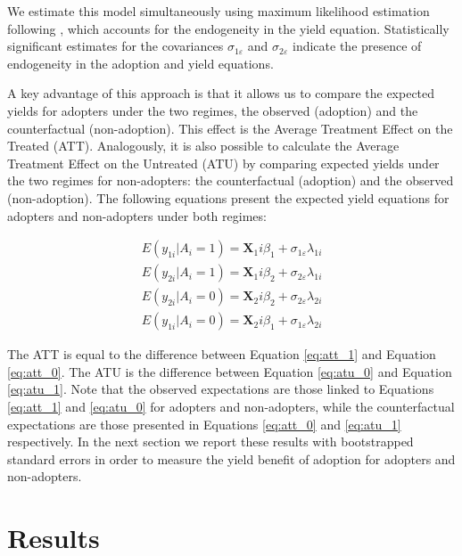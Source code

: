 \documentclass[11pt]{article}
\begin{document}
We estimate this model simultaneously using maximum likelihood estimation following \cite{lokshin2004maximum}, which accounts for the endogeneity in the yield equation.  Statistically significant estimates for the covariances $\sigma_{1\varepsilon}$ and $\sigma_{2\varepsilon}$ indicate the presence of endogeneity in the adoption and yield equations. 


A key advantage of this approach is that it allows us to compare the expected yields for adopters under the two regimes, the observed (adoption) and the counterfactual (non-adoption). This effect is the Average Treatment Effect on the Treated (ATT). Analogously, it is also possible to calculate the Average Treatment Effect on the Untreated (ATU) by comparing expected yields under the two regimes for non-adopters: the counterfactual (adoption) and the observed (non-adoption). The following equations present the expected yield equations for adopters and non-adopters under both regimes:

\begin{subequations}
\begin{align}
    E(y_{1i}|A_i=1)=\bm{X}_1i\beta_1+\sigma_{1\varepsilon} \lambda_{1i} \label{eq:att_1} \\
    E(y_{2i}|A_i=1)=\bm{X}_1i\beta_2+\sigma_{2\varepsilon} \lambda_{1i} \label{eq:att_0} \\
    E(y_{2i}|A_i=0)=\bm{X}_2i\beta_2+\sigma_{2\varepsilon} \lambda_{2i} \label{eq:atu_0} \\
    E(y_{1i}|A_i=0)=\bm{X}_2i\beta_1+\sigma_{1\varepsilon} \lambda_{2i} \label{eq:atu_1}    
\end{align}
\end{subequations}

The ATT is equal to the difference between Equation \ref{eq:att_1} and Equation \ref{eq:att_0}. The ATU is the difference between Equation \ref{eq:atu_0} and Equation \ref{eq:atu_1}. Note that the observed expectations are those linked to Equations \ref{eq:att_1} and \ref{eq:atu_0} for adopters and non-adopters, while the counterfactual expectations are those presented in Equations \ref{eq:att_0} and \ref{eq:atu_1} respectively. In the next section we report these results with bootstrapped standard errors in order to measure the yield benefit of adoption for adopters and non-adopters. 

\section{Results}\label{sec:results}
\end{document}
